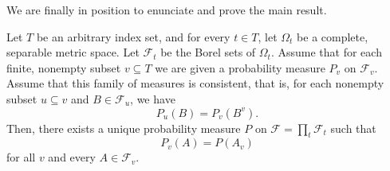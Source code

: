 We are finally in position to enunciate and prove the main result.
\begin{thrm}\label{theorem:Kolmogorov Extension}
		Let \(T\) be an arbitrary index set, and for every \(t\in T\), let \(\Omega_t\) be a complete, separable metric space. Let \(\mathcal{F}_t\) be the Borel sets of \(\Omega_t\). Assume that for each finite, nonempty subset \(v\subseteq T\) we are given a probability measure \(P_v\) on \(\mathcal{F}_v\). Assume that this family of measures is consistent, that is, for each nonempty subset \(u\subseteq v\) and \(B\in\mathcal{F}_u\), we have
		\[
				P_u(B)=P_v\left(B^v\right)
		.\]
		Then, there exists a unique probability measure \(P\) on \(\mathcal{F}=\prod_{t}\mathcal{F}_t\) such that
		\[
				P_v(A)=P(A_v)
		\]
		for all \(v\) and every \(A\in\mathcal{F}_v\).
\end{thrm}

